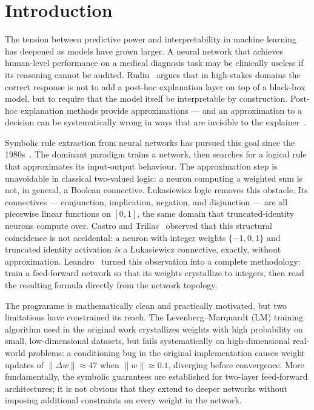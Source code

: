 \documentclass[10pt,a4paper,twoside]{article}
\begin{document}
\section{Introduction}
\label{sec:intro}

The tension between predictive power and interpretability in machine learning
has deepened as models have grown larger.
A neural network that achieves human-level performance on a medical diagnosis
task may be clinically useless if its reasoning cannot be audited.
Rudin~\cite{rudin2019} argues that in high-stakes domains the correct response
is not to add a post-hoc explanation layer on top of a black-box model, but to
require that the model itself be interpretable by construction.
Post-hoc explanation methods provide approximations --- and an approximation
to a decision can be systematically wrong in ways that are invisible to the
explainer~\cite{guidotti2018}.

Symbolic rule extraction from neural networks has pursued this goal since the
1980s~\cite{gallant1988,towell1993,towell1994}.
The dominant paradigm trains a network, then searches for a logical rule that
approximates its input-output behaviour.
The approximation step is unavoidable in classical two-valued logic: a neuron
computing a weighted sum is not, in general, a Boolean connective.
\L{}ukasiewicz logic removes this obstacle.
Its connectives --- conjunction, implication, negation, and disjunction ---
are all piecewise linear functions on $[0,1]$, the same domain that
truncated-identity neurons compute over.
Castro and Trillas~\cite{castro1998} observed that this structural coincidence
is not accidental: a neuron with integer weights $\{-1,0,1\}$ and truncated
identity activation \emph{is} a \L{}ukasiewicz connective, exactly, without
approximation.
Leandro~\cite{leandro2009} turned this observation into a complete
methodology: train a feed-forward network so that its weights crystallize to
integers, then read the resulting formula directly from the network topology.

The programme is mathematically clean and practically motivated, but two
limitations have constrained its reach.
The Levenberg--Marquardt (LM) training algorithm used in the original work
crystallizes weights with high probability on small, low-dimensional datasets,
but fails systematically on high-dimensional real-world problems: a
conditioning bug in the original implementation causes weight updates of
$\|\Delta w\| \approx 47$ when $\|w\| \approx 0.1$, diverging before
convergence.
More fundamentally, the symbolic guarantees are established for two-layer
feed-forward architectures; it is not obvious that they extend to deeper
networks without imposing additional constraints on every weight in the network.
\end{document}
